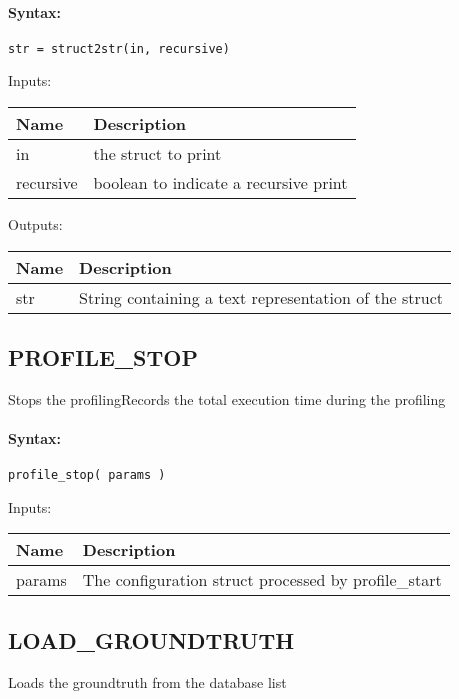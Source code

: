 \paragraph{Syntax:} \verb|str = struct2str(in, recursive)|

\bigskip
Inputs:

\begin{tabular}{|p{}|p{}|}
\hline
\textbf{Name} & \textbf{Description} \\
\hline \hline
in & the struct to print  \\ \hline
recursive & boolean to indicate a recursive print  \\ \hline
\end{tabular}

\bigskip
Outputs:

\begin{tabular}{|p{}|p{}|}
\hline
\textbf{Name} & \textbf{Description} \\
\hline \hline
str & String containing a text representation of the struct  \\ \hline
\end{tabular}

\subsection{PROFILE\_STOP}

Stops the profilingRecords the total execution time during the profiling

\paragraph{Syntax:} \verb|profile_stop( params )|

\bigskip
Inputs:

\begin{tabular}{|p{}|p{}|}
\hline
\textbf{Name} & \textbf{Description} \\
\hline \hline
params & The configuration struct processed by profile\_start  \\ \hline
\end{tabular}


\subsection{LOAD\_GROUNDTRUTH}

Loads the groundtruth from the database list

